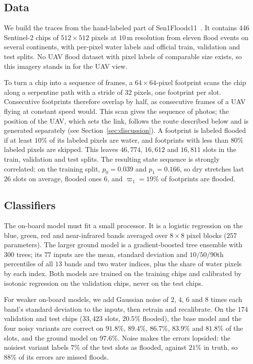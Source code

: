 \documentclass[5p,twocolumn]{elsarticle}
\theoremstyle{remark}
\begin{document}
\subsection{Data}
We build the traces from the hand-labeled part of Sen1Floods11~\cite{bonafilia2020sen1floods11}. It contains 446 Sentinel-2 chips of $512\times512$ pixels at $10$\,m resolution from eleven flood events on several continents, with per-pixel water labels and official train, validation and test splits. No UAV flood dataset with pixel labels of comparable size exists, so this imagery stands in for the UAV view.

To turn a chip into a sequence of frames, a $64\times64$-pixel footprint scans the chip along a serpentine path with a stride of $32$ pixels, one footprint per slot. Consecutive footprints therefore overlap by half, as consecutive frames of a UAV flying at constant speed would. This scan gives the sequence of photos; the position of the UAV, which sets the link, follows the route described below and is generated separately (see Section~\ref{sec:discussion}). A footprint is labeled flooded if at least $10\%$ of its labeled pixels are water, and footprints with less than $80\%$ labeled pixels are skipped. This leaves $46{,}774$, $16{,}612$ and $16{,}811$ slots in the train, validation and test splits. The resulting state sequence is strongly correlated: on the training split, $p_0=0.039$ and $p_1=0.166$, so dry stretches last $26$ slots on average, flooded ones $6$, and $\varpi_1=19\%$ of footprints are flooded.

\subsection{Classifiers}\label{res:cls}
The on-board model must fit a small processor. It is a logistic regression on the blue, green, red and near-infrared bands averaged over $8\times8$ pixel blocks ($257$ parameters). The larger ground model is a gradient-boosted tree ensemble with $300$ trees; its $77$ inputs are the mean, standard deviation and $10/50/90$th percentiles of all $13$ bands and two water indices, plus the share of water pixels by each index. Both models are trained on the training chips and calibrated by isotonic regression on the validation chips, never on the test chips.

For weaker on-board models, we add Gaussian noise of $2$, $4$, $6$ and $8$ times each band's standard deviation to the inputs, then retrain and recalibrate. On the $174$ validation and test chips ($33{,}423$ slots, $20.5\%$ flooded), the base model and the four noisy variants are correct on $91.8\%$, $89.4\%$, $86.7\%$, $83.9\%$ and $81.8\%$ of the slots, and the ground model on $97.6\%$. Noise makes the errors lopsided: the noisiest variant labels $7\%$ of the test slots as flooded, against $21\%$ in truth, so $88\%$ of its errors are missed floods.
\end{document}
